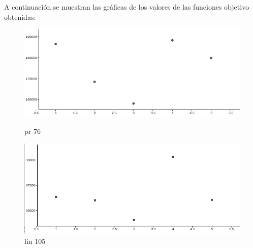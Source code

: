 \documentclass[12pt,a4paper]{article}
\begin{document}
A continuación se muestran las gráficas de los valores de las funciones objetivo obtenidas:
\begin{figure}[h!t]
    \begin{minipage}[b]{0.4\linewidth}
    \centering
    \includegraphics[scale = 0.2]{pr76.png}
    \caption{pr 76}
    \end{minipage}
    \hspace{0.5cm}
    \begin{minipage}[b]{0.4\linewidth}
    \centering
    \includegraphics[scale = 0.2]{lin105.png}
    \caption{lin 105}
    \end{minipage}
\end{figure}
\end{document}
